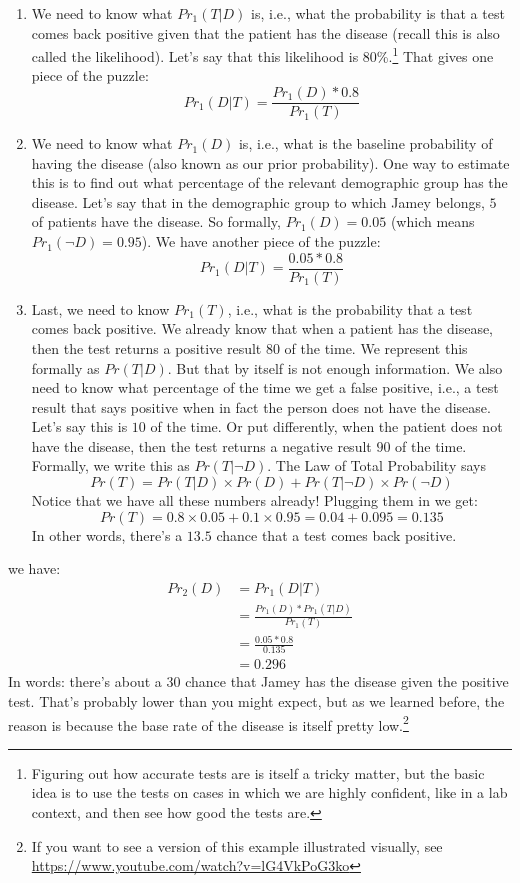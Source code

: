 \documentclass[]{tufte-book}
\begin{document}
\begin{enumerate}
\def\labelenumi{\arabic{enumi}.}
\item
  We need to know what \(Pr_1(T|D)\) is, i.e., what the probability is that a test comes back positive given that the patient has the disease (recall this is also called the likelihood). Let's say that this likelihood is 80\%.\footnote{Figuring out how accurate tests are is itself a tricky matter, but the basic idea is to use the tests on cases in which we are highly confident, like in a lab context, and then see how good the tests are.} That gives one piece of the puzzle: \[Pr_1(D|T) = \frac{Pr_1(D)*0.8}{Pr_1(T)}\]
\item
  We need to know what \(Pr_1(D)\) is, i.e., what is the baseline probability of having the disease (also known as our prior probability). One way to estimate this is to find out what percentage of the relevant demographic group has the disease. Let's say that in the demographic group to which Jamey belongs, \(5%
  \) of patients have the disease. So formally, \(Pr_1(D) = 0.05\) (which means \(Pr_1(\neg D) = 0.95\)). We have another piece of the puzzle: \[Pr_1(D|T) = \frac{0.05*0.8}{Pr_1(T)}\]
\item
  Last, we need to know \(Pr_1(T)\), i.e., what is the probability that a test comes back positive. We already know that when a patient has the disease, then the test returns a positive result \(80%
  \) of the time. We represent this formally as \(Pr(T|D)\). But that by itself is not enough information. We also need to know what percentage of the time we get a false positive, i.e., a test result that says positive when in fact the person does not have the disease. Let's say this is \(10%
  \) of the time. Or put differently, when the patient does not have the disease, then the test returns a negative result \(90%
  \) of the time. Formally, we write this as \(Pr(T|\neg D)\). The Law of Total Probability says \[Pr(T) = Pr(T|D)\times Pr(D) + Pr(T|\neg D)\times Pr(\neg D)\] Notice that we have all these numbers already! Plugging them in we get: \[Pr(T) = 0.8\times 0.05 + 0.1 \times 0.95=0.04+0.095=0.135\] In other words, there's a \(13.5%
  \) chance that a test comes back positive.
\end{enumerate}

 we have:
\[
  \begin{aligned}
    Pr_2(D) &= Pr_1(D|T) \\
            &= \frac{Pr_1(D)*Pr_1(T|D)}{Pr_1(T)} \\
            &= \frac{0.05*0.8}{0.135}\\
            &=0.296
  \end{aligned}
\]
In words: there's about a \(30%
\) chance that Jamey has the disease given the positive test. That's probably lower than you might expect, but as we learned before, the reason is because the base rate of the disease is itself pretty low.\footnote{If you want to see a version of this example illustrated visually, see \url{https://www.youtube.com/watch?v=lG4VkPoG3ko}}
\end{document}
